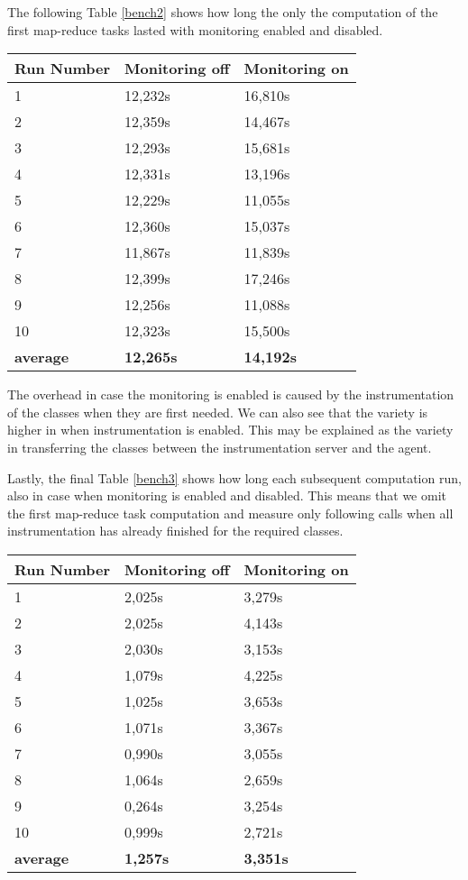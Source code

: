 The following Table \ref{bench2} shows how long the only the computation of the  first map-reduce tasks lasted with monitoring enabled and disabled.

\begin{center}
	\begin{tabular}{ l l l }
		\hline
		Run Number & Monitoring off & Monitoring on \\ \hline
1	&12,232s&	16,810s  \\ 
2 	&12,359s &	14,467s \\ 
3	&12,293s &	15,681s \\ 
4	&12,331s &	13,196s \\ 
5	&12,229s &	11,055s \\ 
6	&12,360s &	15,037s \\ 
7 &	11,867s	&11,839s  \\ 
8	 &	12,399s &17,246s  \\ 
9&	12,256s 	&11,088s  \\ 
10	&12,323s &	15,500s \\ 

		\hline  
		\textbf{average} & \textbf{12,265s} & \textbf{14,192s} \\
	\end{tabular}
	\label{bench2}
\end{center}

The overhead in case  the monitoring is enabled is caused by the instrumentation of the classes when they are first needed. We can also see that the variety is higher in when instrumentation is enabled. This may be explained as the variety in transferring the classes between the instrumentation server and the agent.

Lastly, the final Table \ref{bench3} shows how long each subsequent computation run, also in case when monitoring is enabled and disabled. This means that we omit the first map-reduce task computation and measure only following calls when all instrumentation has already finished for the required classes.
\begin{center}
	\begin{tabular}{ l l l }
		\hline
		Run Number & Monitoring off & Monitoring on \\ \hline
1&	2,025s&	3,279s \\ 
2&	2,025s&	4,143s \\
3&	2,030s	&3,153s \\
4&	1,079s&	4,225s \\
5&	1,025s&	3,653s \\
6&	1,071s	&3,367s \\
7	&0,990s&	3,055s \\
8&	1,064s	&2,659s \\
9&	0,264s&	3,254s \\
10&	0,999s&	2,721s \\

\hline  
\textbf{average} & \textbf{1,257s} & \textbf{3,351s} \\
\end{tabular}
\label{bench3}

\end{center}

